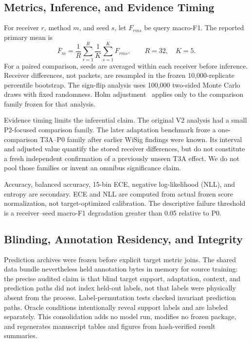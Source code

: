 \subsection{Metrics, Inference, and Evidence Timing}
For receiver $r$, method $m$, and seed $s$, let $F_{rms}$ be query macro-F1. The reported primary mean is
\begin{equation}
 \overline F_m=\frac{1}{R}\sum_{r=1}^{R}\frac{1}{K}\sum_{s=1}^{K}F_{rms},
 \qquad R=32,\quad K=5.
\end{equation}
For a paired comparison, seeds are averaged within each receiver before inference. Receiver differences, not packets, are resampled in the frozen 10,000-replicate percentile bootstrap. The sign-flip analysis uses 100,000 two-sided Monte Carlo draws with fixed randomness. Holm adjustment~\cite{holm} applies only to the comparison family frozen for that analysis.

Evidence timing limits the inferential claim. The original V2 analysis had a small P2-focused comparison family. The later adaptation benchmark froze a one-comparison T3A--P0 family after earlier WiSig findings were known. Its interval and adjusted value quantify the stored receiver differences, but do not constitute a fresh independent confirmation of a previously unseen T3A effect. We do not pool those families or invent an omnibus significance claim.

Accuracy, balanced accuracy, 15-bin ECE, negative log-likelihood (NLL), and entropy are secondary. ECE and NLL are computed from actual frozen score normalization, not target-optimized calibration. The descriptive failure threshold is a receiver--seed macro-F1 degradation greater than 0.05 relative to P0.

\subsection{Blinding, Annotation Residency, and Integrity}
Prediction archives were frozen before explicit target metric joins. The shared data bundle nevertheless held annotation bytes in memory for source training: the precise audited claim is that blind target support, adaptation, context, and prediction paths did not index held-out labels, not that labels were physically absent from the process. Label-permutation tests checked invariant prediction paths. Oracle conditions intentionally reveal support labels and are labeled separately. This consolidation adds no model run, modifies no frozen package, and regenerates manuscript tables and figures from hash-verified result summaries.
